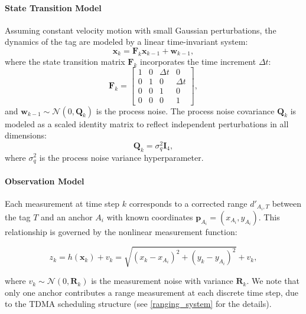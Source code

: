 \paragraph{State Transition Model}

Assuming constant velocity motion with small Gaussian perturbations, the dynamics of the tag are modeled by a linear time-invariant system:
\begin{equation}
    \mathbf{x}_k = \mathbf{F}_k \mathbf{x}_{k-1} + \mathbf{w}_{k-1},
\end{equation}
where the state transition matrix $\mathbf{F}_k$ incorporates the time increment $\Delta t$:
\begin{equation}
    \mathbf{F}_k =
    \begin{bmatrix}
        1 & 0 & \Delta t & 0 \\
        0 & 1 & 0 & \Delta t \\
        0 & 0 & 1 & 0 \\
        0 & 0 & 0 & 1
    \end{bmatrix},
\end{equation}
and $\mathbf{w}_{k-1} \sim \mathcal{N}(0, \mathbf{Q}_k)$ is the process noise. The process noise covariance $\mathbf{Q}_k$ is modeled as a scaled identity matrix to reflect independent perturbations in all dimensions:
\begin{equation}
    \mathbf{Q}_k = \sigma^2_q \mathbf{I}_4,
\end{equation}
where $\sigma^2_q$ is the process noise variance hyperparameter.

\paragraph{Observation Model}

Each measurement at time step $k$ corresponds to a corrected range $d'_{A_i,T}$ between the tag $T$ and an anchor $A_i$ with known coordinates $\mathbf{p}_{A_i} = (x_{A_i}, y_{A_i})$. This relationship is governed by the nonlinear measurement function:

\begin{equation}
    z_k = h(\mathbf{x}_k) + v_k = \sqrt{(x_k - x_{A_i})^2 + (y_k - y_{A_i})^2} + v_k,
\end{equation}

where $v_k \sim \mathcal{N}(0, \mathbf{R}_k)$ is the measurement noise with variance $\mathbf{R}_k$. We note that only one anchor contributes a range measurement at each discrete time step, due to the TDMA scheduling structure (see \autoref{ranging_system} for the details).

